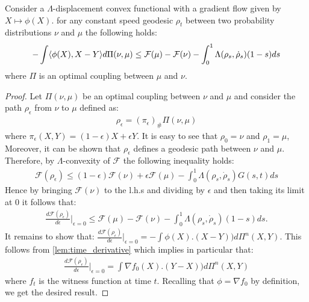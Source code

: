 \begin{lemma}	\label{lem:grad_flow_lambda_version}
Consider a $\Lambda$-displacement convex functional with a gradient flow given by  $X\mapsto \phi(X)$. for any constant speed geodesic $\rho_t$ between two probability distributions $\nu$ and $\mu$ the following holds:
\begin{align*}
	-\int \langle \phi(X),X-Y \rangle d\Pi(\nu,\mu)
	\leq
	{{\mathcal F}}(\mu)- {{\mathcal F}}(\nu) -\int_0^1 \Lambda(\rho_s,\dot{\rho}_s)(1-s)ds
\end{align*}
where $\Pi$ is an optimal coupling between $\mu$ and $\nu$.
\end{lemma}
\begin{proof}
Let  $\Pi(\nu,\mu)$ be an optimal coupling between $\nu$ and $\mu$ and consider the path $\rho_{\epsilon}$ from $\nu$ to $\mu$ defined as:
\begin{align}
	\rho_{\epsilon} = (\pi_{\epsilon})_{\#}\Pi(\nu,\mu) 
\end{align}
where $\pi_{\epsilon}(X,Y)=(1-\epsilon)X+\epsilon Y$. It is easy to see that $\rho_0=\nu$ and $\rho_1=\mu$, Moreover, it can be shown that $\rho_{\epsilon}$ defines a geodesic path between $\nu$ and $\mu$. Therefore, by $\Lambda$-convexity of $\mathcal{F}$ the following inequality holds:
	\begin{align*}
		\mathcal{F}(\rho_{\epsilon})\leq (1-\epsilon)\mathcal{F}(\nu)+\epsilon \mathcal{F}(\mu) - \int_0^1 \Lambda(\rho_s,\dot{\rho}_s)G(s,t)ds
	\end{align*}
	Hence by bringing $\mathcal{F}(\nu)$ to the l.h.s and dividing by $\epsilon$ and then taking its limit at $0$ it follows that:
	\begin{align*}
	\frac{d\mathcal{F}(\rho_{\epsilon})}{d\epsilon}\vert_{\epsilon=0}\leq \mathcal	{F}(\mu)-\mathcal{F}(\nu)-\int_0^1 \Lambda(\rho_s,\dot{\rho}_s)(1-s)ds.	
	\end{align*}
	It remains to show that: $\frac{d\mathcal{F}(\rho_{\epsilon})}{d\epsilon}\vert_{\epsilon=0} = - \int \phi(X).(X-Y))d\Pi^n(X,Y)$. This follows from \cref{lem:time_derivative} which implies in particular that:
	\begin{align*}
		\frac{d\mathcal{F}(\rho_{\epsilon})}{d\epsilon}\vert_{\epsilon=0} = \int \nabla f_0(X).(Y-X))d\Pi^n(X,Y)
	\end{align*}
	where $f_t$ is the witness function at time $t$.
	 Recalling that $\phi=\nabla f_0$ by definition, we get the desired result.
\end{proof}





